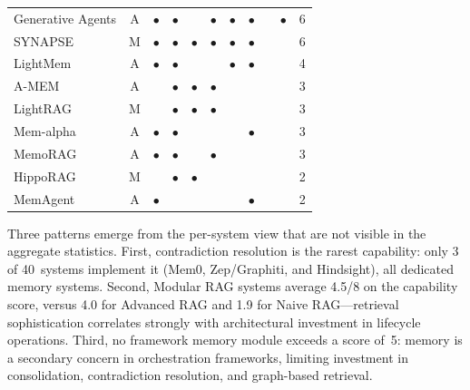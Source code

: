 \begin{table}[!t]
\begin{tabular}{@{}lc cccccccc r@{}}
Generative Agents    & A & $\bullet$ & $\bullet$ &           & $\bullet$ & $\bullet$ & $\bullet$ &           & $\bullet$ & 6 \\
SYNAPSE              & M & $\bullet$ & $\bullet$ & $\bullet$ & $\bullet$ & $\bullet$ & $\bullet$ &           &           & 6 \\
LightMem             & A & $\bullet$ & $\bullet$ &           &           & $\bullet$ & $\bullet$ &           &           & 4 \\
A-MEM                & A &           & $\bullet$ & $\bullet$ & $\bullet$ &           &           &           &           & 3 \\
LightRAG             & M &           & $\bullet$ & $\bullet$ & $\bullet$ &           &           &           &           & 3 \\
Mem-alpha            & A & $\bullet$ & $\bullet$ &           &           &           & $\bullet$ &           &           & 3 \\
MemoRAG              & A & $\bullet$ & $\bullet$ &           & $\bullet$ &           &           &           &           & 3 \\
HippoRAG            & M &           & $\bullet$ & $\bullet$ &           &           &           &           &           & 2 \\
MemAgent             & A & $\bullet$ &           &           &           &           & $\bullet$ &           &           & 2 \\
\bottomrule
\end{tabular}
\end{table}

Three patterns emerge from the per-system view that are not visible in the
aggregate statistics.  First, contradiction resolution is the rarest
capability: only 3 of 40~systems implement it (Mem0, Zep/Graphiti,
and Hindsight), all dedicated memory systems.  Second, Modular RAG systems
average 4.5/8 on the capability score, versus 4.0 for Advanced RAG and 1.9
for Naive RAG---retrieval sophistication correlates strongly with
architectural investment in lifecycle operations.  Third, no framework memory
module exceeds a score of~5: memory is a secondary concern in orchestration
frameworks, limiting investment in consolidation, contradiction resolution,
and graph-based retrieval.

